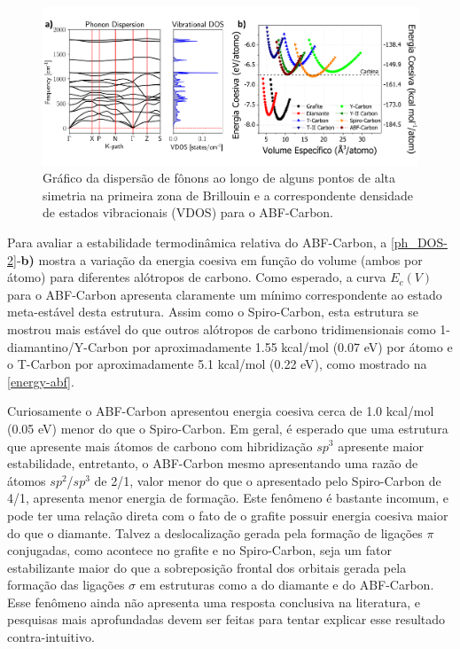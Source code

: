 		\begin{figure}[ht]
			\centering
			\includegraphics[width=1\linewidth]{capitulos/fig/results2/cohesive_abf-carbon}
			\caption{Gráfico da dispersão de fônons ao longo de alguns pontos de alta simetria na primeira zona de Brillouin e a correspondente densidade de estados vibracionais (VDOS) para o ABF-Carbon.}
			\label{ph_DOS-2}
		\end{figure}

		Para avaliar a estabilidade termodinâmica relativa do ABF-Carbon, a \autoref{ph_DOS-2}-\textbf{b)} mostra a variação da energia coesiva em função do volume (ambos por átomo) para diferentes alótropos de carbono. Como esperado, a curva $E_c(V)$ para o ABF-Carbon apresenta claramente um mínimo correspondente ao estado meta-estável desta estrutura. Assim como o Spiro-Carbon, esta estrutura se mostrou mais estável do que outros alótropos de carbono tridimensionais  como  1-diamantino/Y-Carbon \cite{costa2018n,li2014modulated} por aproximadamente 1.55 kcal/mol (0.07 eV) por átomo e o T-Carbon \cite{sheng2011t} por aproximadamente 5.1 kcal/mol (0.22 eV), como mostrado na \autoref{energy-abf}. 
		
		Curiosamente o ABF-Carbon apresentou energia coesiva cerca de 1.0 kcal/mol (0.05 eV) menor do que o Spiro-Carbon. Em geral, é esperado que uma estrutura que apresente mais átomos de carbono com hibridização $sp^3$ apresente maior estabilidade, entretanto, o ABF-Carbon mesmo apresentando uma razão de átomos $sp^2$/$sp^3$ de 2/1, valor menor do que o apresentado pelo Spiro-Carbon de 4/1, apresenta menor energia de formação. Este fenômeno é bastante incomum, e pode ter uma relação direta com o fato de o grafite possuir energia coesiva maior do que o diamante. Talvez a deslocalização gerada pela formação de ligações $\pi$ conjugadas, como acontece no grafite e no Spiro-Carbon, seja um fator estabilizante maior do que a sobreposição frontal dos orbitais gerada pela formação das ligações $\sigma$ em estruturas como a do diamante e do ABF-Carbon. Esse fenômeno ainda não apresenta uma resposta conclusiva na literatura, e pesquisas mais aprofundadas devem ser feitas para tentar explicar esse resultado contra-intuitivo. 
		
